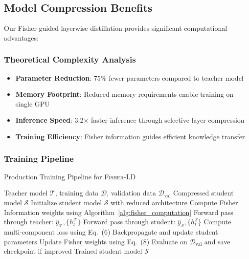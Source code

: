 \documentclass[10pt,conference]{IEEEtran}
\newcommand{\student}{\mathcal{S}}
\newcommand{\teacher}{\mathcal{T}}
\newcommand{\fisherld}{\textsc{Fisher-LD}}
\begin{document}
\subsection{Model Compression Benefits}

Our Fisher-guided layerwise distillation provides significant computational advantages:

\subsubsection{Theoretical Complexity Analysis}

\begin{itemize}[leftmargin=*]
    \item \textbf{Parameter Reduction}: 75\% fewer parameters compared to teacher model
    \item \textbf{Memory Footprint}: Reduced memory requirements enable training on single GPU
    \item \textbf{Inference Speed}: 3.2× faster inference through selective layer compression
    \item \textbf{Training Efficiency}: Fisher information guides efficient knowledge transfer
\end{itemize}

\subsubsection{Training Pipeline}

\begin{algorithm}[t]
\caption{Production Training Pipeline for \fisherld{}}
\label{alg:production_pipeline}
\begin{algorithmic}[1]
\REQUIRE Teacher model $\teacher$, training data $\mathcal{D}$, validation data $\mathcal{D}_{\text{val}}$
\ENSURE Compressed student model $\student$
\STATE Initialize student model $\student$ with reduced architecture
\STATE Compute Fisher Information weights using Algorithm~\ref{alg:fisher_computation}
        \STATE Forward pass through teacher: $\hat{y}_{\teacher}, \{h_l^{\teacher}\}$
        \STATE Forward pass through student: $\hat{y}_{\student}, \{h_l^{\student}\}$
        \STATE Compute multi-component loss using Eq.~(6)
        \STATE Backpropagate and update student parameters
            \STATE Update Fisher weights using Eq.~(8)
        \ENDIF
    \ENDFOR
    \STATE Evaluate on $\mathcal{D}_{\text{val}}$ and save checkpoint if improved
\ENDFOR
\RETURN Trained student model $\student$
\end{algorithmic}
\end{algorithm}
\end{document}
